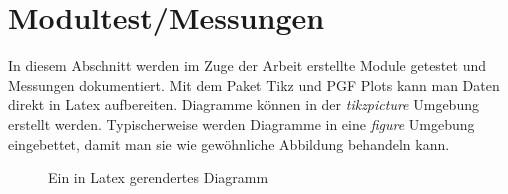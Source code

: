 

\section{Modultest/Messungen}

In diesem Abschnitt werden im Zuge der Arbeit erstellte Module getestet und Messungen dokumentiert. Mit dem Paket Tikz und PGF Plots kann man Daten direkt in Latex aufbereiten. Diagramme können in der \emph{tikzpicture} Umgebung erstellt werden. Typischerweise werden Diagramme in eine \emph{figure} Umgebung eingebettet, damit man sie wie gewöhnliche Abbildung behandeln kann.

\begin{figure}[htbp]
	\centering
	
	
	\caption{Ein in Latex gerendertes Diagramm}
	\label{pic:LatexDiagramm}
\end{figure}


